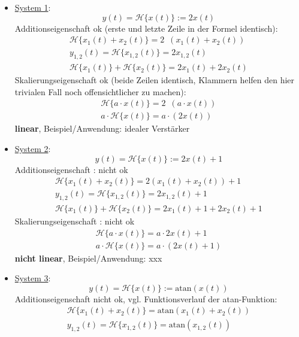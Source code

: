 \documentclass[11pt,a4paper,DIV=12]{scrartcl}
\numberwithin{equation}{section}
\numberwithin{figure}{section}
\newcommand{\sysH}[1]{\mathcal{H}{\{#1\}}}
\begin{document}
\begin{Loesung}
\begin{itemize}
\item  \underline{System 1}:
\begin{equation}
y(t) = \sysH{x(t)}:=2 x(t)
\end{equation}
Additionseigenschaft ok (erste und letzte Zeile in der Formel identisch):
\begin{align}
\sysH{x_1(t)+x_2(t)}=2\,\,\,(x_1(t) + x_2(t))\\
y_{1,2}(t) = \sysH{x_{1,2}(t)}=2 x_{1,2}(t)\\
\sysH{x_1(t)} + \sysH{x_2(t)} = 2 x_1(t) + 2 x_2(t)
\end{align}
Skalierungseigenschaft ok (beide Zeilen identisch, Klammern helfen den hier trivialen
Fall noch offensichtlicher zu machen):
\begin{align}
\sysH{a \cdot x(t)}= 2\,\,\,( a \cdot x(t))\\
a \cdot \sysH{x(t)}=  a \cdot (2 x(t))
\end{align}
\textbf{linear}, Beispiel/Anwendung: idealer Verstärker
\item  \underline{System 2}:
\begin{equation}
y(t) = \sysH{x(t)}:= 2 x(t) + 1
\end{equation}
Additionseigenschaft : nicht ok
\begin{align}
\sysH{x_1(t)+x_2(t)}= 2(x_1(t)+x_2(t)) + 1\\
y_{1,2}(t) = \sysH{x_{1,2}(t)}= 2 x_{1,2}(t) + 1\\
\sysH{x_1(t)} + \sysH{x_2(t)} = 2 x_{1}(t) + 1 + 2 x_{2}(t) + 1
\end{align}
Skalierungseigenschaft : nicht ok
\begin{align}
\sysH{a \cdot x(t)}= a \cdot 2 x(t) + 1\\
a \cdot \sysH{x(t)}= a \cdot (2 x(t) + 1)
\end{align}
\textbf{nicht linear}, Beispiel/Anwendung: xxx
\item  \underline{System 3}:
\begin{equation}
y(t) = \sysH{x(t)}:= \mathrm{atan}(x(t))
\end{equation}
Additionseigenschaft nicht ok, vgl. Funktionsverlauf der atan-Funktion:
\begin{align}
\sysH{x_1(t)+x_2(t)}=\mathrm{atan}(x_1(t)+x_2(t))\\
y_{1,2}(t) = \sysH{x_{1,2}(t)}= \mathrm{atan}(x_{1,2}(t))\\

\end{align}
\end{itemize}
\end{Loesung}
\end{document}
